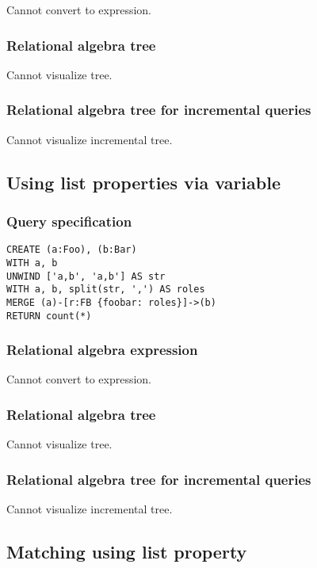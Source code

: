 Cannot convert to expression.

\subsubsection*{Relational algebra tree}

Cannot visualize tree.

\subsubsection*{Relational algebra tree for incremental queries}

Cannot visualize incremental tree.

\subsection{Using list properties via variable}

\subsubsection*{Query specification}

\begin{lstlisting}
CREATE (a:Foo), (b:Bar)
WITH a, b
UNWIND ['a,b', 'a,b'] AS str
WITH a, b, split(str, ',') AS roles
MERGE (a)-[r:FB {foobar: roles}]->(b)
RETURN count(*)
\end{lstlisting}

\subsubsection*{Relational algebra expression}

Cannot convert to expression.

\subsubsection*{Relational algebra tree}

Cannot visualize tree.

\subsubsection*{Relational algebra tree for incremental queries}

Cannot visualize incremental tree.

\subsection{Matching using list property}


